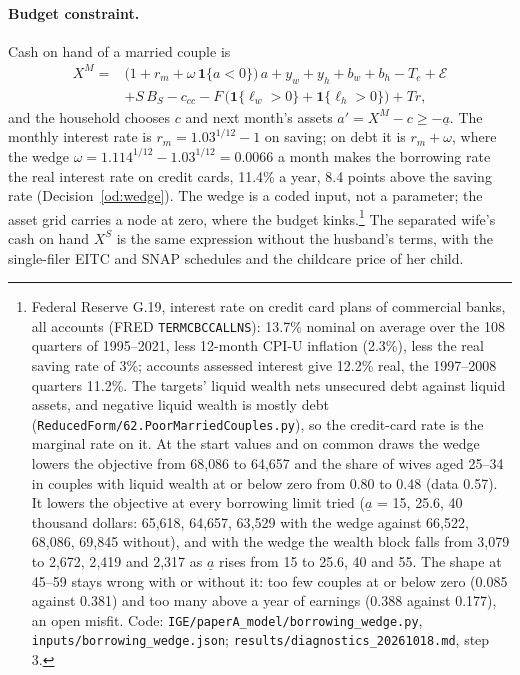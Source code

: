 \documentclass[11pt]{article}
\newcommand{\code}[1]{\texttt{#1}}
\newcommand{\1}{\mathbf{1}}
\begin{document}
\paragraph{Budget constraint.} Cash on hand of a married couple is
\begin{equation}\label{eq:budget}
  \begin{aligned}
  X^M = {} & \big(1 + r_m + \omega\,\1\{a < 0\}\big)\,a + y_w + y_h + b_w + b_h - T_e + \mathcal E \\
           & + S\, B_S - c_{cc} - F\,\big(\1\{\ell_w > 0\} + \1\{\ell_h > 0\}\big) + Tr,
  \end{aligned}
\end{equation}
and the household chooses $c$ and next month's assets $a' = X^M - c \ge -\underline{a}$. The monthly interest rate is
$r_m = 1.03^{1/12} - 1$ on saving; on debt it is $r_m + \omega$, where the wedge
$\omega = 1.114^{1/12} - 1.03^{1/12} = 0.0066$ a month makes the borrowing rate the real interest rate on credit cards,
11.4\% a year, 8.4 points above the saving rate (Decision~\ref{od:wedge}). The wedge is a coded input, not a parameter;
the asset grid carries a node at zero, where the budget kinks.\footnote{Federal Reserve G.19, interest rate on credit
card plans of commercial banks, all accounts (FRED \code{TERMCBCCALLNS}): 13.7\% nominal on average over the 108
quarters of 1995--2021, less 12-month CPI-U inflation (2.3\%), less the real saving rate of 3\%; accounts assessed
interest give 12.2\% real, the 1997--2008 quarters 11.2\%. The targets' liquid wealth nets unsecured debt against liquid
assets, and negative liquid wealth is mostly debt (\code{ReducedForm/62.PoorMarriedCouples.py}), so the credit-card rate
is the marginal rate on it. At the start values and on common draws the wedge lowers the objective from 68{,}086 to
64{,}657 and the share of wives aged 25--34 in couples with liquid wealth at or below zero from 0.80 to 0.48 (data
0.57). It lowers the objective at every borrowing limit tried ($\underline a$ = 15, 25.6, 40 thousand dollars: 65{,}618,
64{,}657, 63{,}529 with the wedge against 66{,}522, 68{,}086, 69{,}845 without), and with the wedge the wealth block
falls from 3{,}079 to 2{,}672, 2{,}419 and 2{,}317 as $\underline a$ rises from 15 to 25.6, 40 and 55. The shape at
45--59 stays wrong with or without it: too few couples at or below zero (0.085 against 0.381) and too many above a year
of earnings (0.388 against 0.177), an open misfit. Code: \code{IGE/paperA\_model/borrowing\_wedge.py},
\code{inputs/borrowing\_wedge.json}; \code{results/diagnostics\_20261018.md}, step 3.} The separated wife's cash on hand $X^S$ is the same expression
without the husband's terms, with the single-filer EITC and SNAP schedules and the childcare price of her child.
\end{document}

